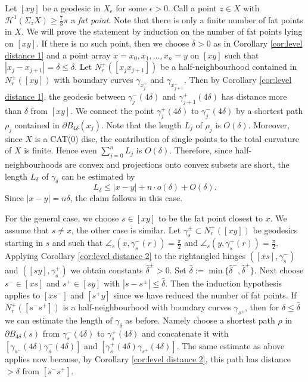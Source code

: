 \documentclass[a4paper,10pt]{amsart}
\begin{document}
Let $[xy]$ be a geodesic in $X_\epsilon$ for some $\epsilon>0$. Call a point
$z\in X$ with $\mathcal{H}^1(\Sigma_z X)\geq \frac{7}{3}\pi$ a {\em fat point}. 
Note that there is only a finite number of 
fat points in $X$. We will prove the statement by induction on  the number 
of fat points lying on $[xy]$. If there is no such point, then we choose $\bar\delta>0$ 
as in Corollary \ref{cor:level distance 1} and a point array
$x=x_0,x_1,\ldots,x_n=y$ on $[xy]$ such that $|x_j-x_{j+1}|=\delta\leq\bar\delta$. Let $N_r^ +([x_j x_{j+1}])$ 
be a half-neighbourhood contained in $N_r^ +([x y])$
with boundary curves $\gamma_{x_j^ +}$ and $\gamma_{x_{j+1}^ -}$. Then by Corollary \ref{cor:level distance 1}, 
the geodesic between $\gamma_j^ -(4\delta)$
and $\gamma_{j+1}^ +(4\delta)$ has distance more than $\delta$ from $[xy]$. We connect the point 
$\gamma_j^ +(4\delta)$ to $\gamma_j^ -(4\delta)$ by a shortest path $\rho_j$
contained in $\partial B_{4\delta}(x_j)$. Note that the length $L_j$ of $\rho_j$ is $O(\delta)$. 
Moreover, since $X$
is a CAT(0) disc, the contribution of single points to the total curvature of $X$ is finite. Hence 
even $\sum_{j=0}^ n L_j$ is $O(\delta)$.
Therefore, since half-neighbourhoods are convex and projections onto convex subsets are short, the 
length $L_\delta$ of $\gamma_\delta$ can be
estimated by 
$$
L_\delta\leq |x-y|+n\cdot o(\delta)+O(\delta).
$$
Since $|x-y|=n\delta$, the claim follows in this case.

For the general case, we choose $s\in[xy]$ to be the fat point closest to $x$. We assume that $s\neq x$,
the other case is similar. Let $\gamma_s^\pm\subset N_r^+([x y])$ be geodesics starting in $s$ and such that 
$\angle_s(x,\gamma_s^-(r))=\frac{\pi}{2}$ and $\angle_s(y,\gamma_s^+(r))=\frac{\pi}{2}$. Applying Corollary 
\ref{cor:level distance 2}
to the rightangled hinges $([xs],\gamma_s^-)$ and $([sy],\gamma_s^+)$ we obtain constants $\hat\delta^\pm>0$. 
Set $\hat\delta:=\min\{\hat\delta^-,\hat\delta^+\}$.
Next choose $s^-\in[xs]$ and $s^+\in[sy]$ with $|s-s^\pm|\leq\hat\delta$. Then the induction hypothesis applies 
to $[xs^-]$ and $[s^+y]$ since we have reduced 
the number of fat points. If $N^+_r([s^- s^+])$ is a half-neighbourhood with boundary curves $\gamma_{s^\pm}$, 
then for $\delta\leq\hat\delta$ we can estimate the length of $\gamma_\delta$ as before. 
Namely choose a shortest path $\rho$ in $\partial B_{4\delta}(s)$ from $\gamma_s^-(4\delta)$ to $\gamma_s^+(4\delta)$ 
and concatenate it 
with $[\gamma_{s^-}(4\delta)\gamma_s^-(4\delta)]$ and $[\gamma_s^+(4\delta)\gamma_{s^+}(4\delta)]$. The same estimate 
as above applies now because, by Corollary \ref{cor:level distance 2}, this path has distance $>\delta$ from $[s^- s^+]$.
\qeds
\end{document}
